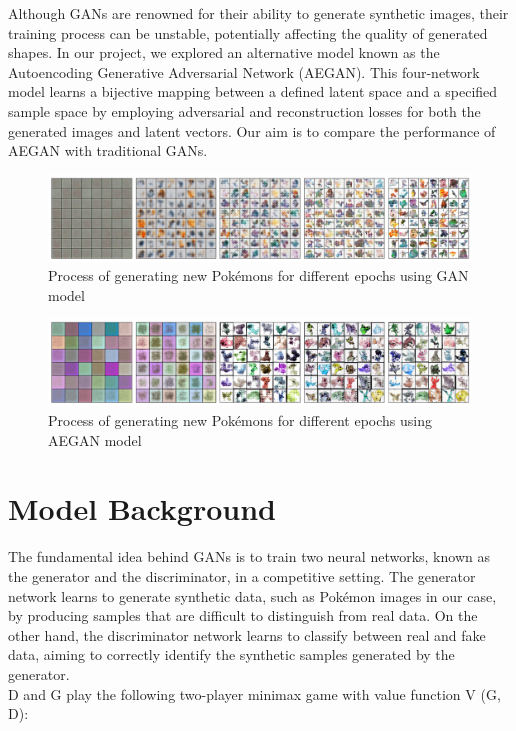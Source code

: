 \documentclass[letterpaper]{article} %
\begin{document}
Although GANs are renowned for their ability to generate synthetic images, their training process can be unstable, potentially affecting the quality of generated shapes. In our project, we explored an alternative model known as the Autoencoding Generative Adversarial Network (AEGAN)\cite{AEGAN}. This four-network model learns a bijective mapping between a defined latent space and a specified sample space by employing adversarial and reconstruction losses for both the generated images and latent vectors. Our aim is to compare the performance of AEGAN with traditional GANs.

\begin{figure}[htbp]
\captionsetup[subfigure]{justification=centering}
  \centering
  \includegraphics[scale = 0.55]{image/process.png}
  \caption{Process of generating new Pokémons for different epochs using GAN model}\label{fig:pok1}
\end{figure}
\begin{figure}[htbp]
\captionsetup[subfigure]{justification=centering}
  \centering
  \includegraphics[scale = 0.55]{image/AEGAN process.png}
  \caption{Process of generating new Pokémons for different epochs using AEGAN model}\label{fig:pok2}
\end{figure}
 
\section{Model Background}

The fundamental idea behind GANs is to train two neural networks, known as the generator and the discriminator, in a competitive setting. The generator network learns to generate synthetic data, such as Pokémon images in our case, by producing samples that are difficult to distinguish from real data. On the other hand, the discriminator network learns to classify between real and fake data, aiming to correctly identify the synthetic samples generated by the generator. \\
D and G play the following two-player minimax game with value function V (G, D)\cite{GAN}:
\end{document}
